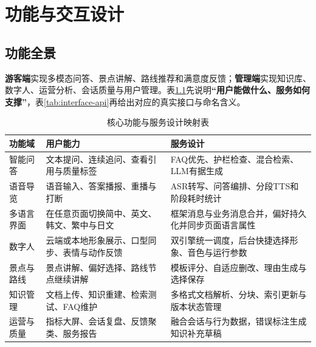 \chapter{功能与交互设计}

\section{功能全景}

\textbf{游客端}实现多模态问答、景点讲解、路线推荐和满意度反馈；\textbf{管理端}实现知识库、数字人、运营分析、会话质量与用户管理。表\ref{tab:function-api}先说明\textbf{“用户能做什么、服务如何支撑”}，表\ref{tab:interface-api}再给出对应的真实接口与命名含义。

\begin{table}[H]
  \centering
  \small
  \renewcommand{\arraystretch}{1.08}
  \caption{核心功能与服务设计映射表}\label{tab:function-api}
  \begin{tabularx}{\textwidth}{p{}p{}X}
    \toprule
    功能域 & 用户能力 & 服务设计 \\
    \midrule
    智能问答 & 文本提问、连续追问、查看引用与质量标签 & FAQ优先、护栏检查、混合检索、LLM有据生成 \\
    语音导览 & 语音输入、答案播报、重播与打断 & ASR转写、问答编排、分段TTS和阶段耗时统计 \\
    多语言界面 & 在任意页面切换简中、英文、韩文、繁中与日文 & 框架消息与业务消息合并，偏好持久化并同步页面语言属性 \\
    数字人 & 云端或本地形象展示、口型同步、表情与动作反馈 & 双引擎统一调度，后台快捷选择形象、音色与运行参数 \\
    景点与路线 & 景点讲解、偏好选择、路线节点继续讲解 & 模板评分、自适应删改、理由生成与选择保存 \\
    知识管理 & 文档上传、知识重建、检索测试、FAQ维护 & 多格式文档解析、分块、索引更新与版本状态管理 \\
    运营与质量 & 指标大屏、会话复盘、反馈聚类、服务报告 & 融合会话与行为数据，错误标注生成知识补充草稿 \\
    \bottomrule
  \end{tabularx}
\end{table}

